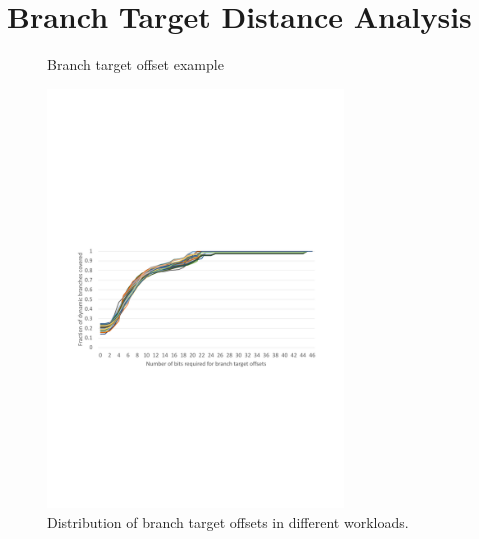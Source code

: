 \section{Branch Target Distance Analysis}
\label{sec:analysis}

\begin{figure}[b]
  \sffamily
  \centering
  \caption{\label{fig:concat} Branch target offset example}
\end{figure}

\begin{figure}[t!]
    \centering
    \includegraphics[width=0.7\textwidth, trim=60 280 50 320, clip]{figures/offset_distribution.pdf}
    \caption{Distribution of branch target offsets in different workloads.}
    \label{fig:offsets}
\end{figure}


